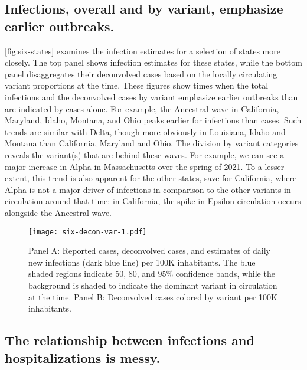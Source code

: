     
\subsection{Infections, overall and by variant, emphasize earlier outbreaks.}
\label{sec:infections-by-voc}

\autoref{fig:six-states} examines the infection estimates for a selection of
states more closely. The top panel shows infection estimates for these states,
while the bottom panel disaggregates their deconvolved cases based on the locally
circulating variant proportions at the time. These figures show times when the
total infections and the deconvolved cases by variant emphasize earlier
outbreaks than are indicated by cases alone. For example, the Ancestral
wave in California, Maryland, Idaho, Montana, and Ohio peaks earlier for
infections than cases. Such trends are similar with Delta, though more obviously
in Louisiana, Idaho and Montana than California, Maryland and Ohio. The division
by variant categories reveals the variant(s) that are behind these waves. For
example, we can see a major increase in Alpha in Massachusetts over the spring
of 2021. To a lesser extent, this trend is also apparent for the other states,
save for California, where Alpha is not a major driver of infections in
comparison to the other variants in circulation around that time: in California,
the spike in Epsilon circulation occurs alongside the Ancestral wave.



\begin{figure}[!tb]
\centering
    \texttt{[image: six-decon-var-1.pdf]}
    \caption{Panel A: Reported cases, deconvolved cases, and estimates of
    daily new infections (dark blue line) per 100K inhabitants. The blue shaded
    regions indicate 50, 80, and 95\% confidence bands, while the background
    is shaded to indicate the dominant variant in circulation at the time.  
    Panel B: Deconvolved cases colored by variant per 100K inhabitants.}
    \label{fig:six-states}
\end{figure}


\subsection{The relationship between infections and hospitalizations is messy.}
\label{sec:lagged-correlations}

